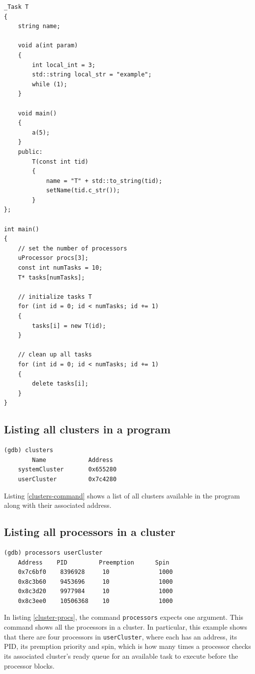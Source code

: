 \begin{lstlisting}[style=C++, caption={\uCPPS source code used for GDB commands},
label={uCPP-src-code}, basicstyle=\small]
_Task T
{
    string name;

    void a(int param)
    {
        int local_int = 3;
        std::string local_str = "example";
        while (1);
    }

    void main()
    {
        a(5);
    }
    public:
        T(const int tid)
        {
            name = "T" + std::to_string(tid);
            setName(tid.c_str());
        }
};

int main()
{
    // set the number of processors
    uProcessor procs[3];
    const int numTasks = 10;
    T* tasks[numTasks];

    // initialize tasks T
    for (int id = 0; id < numTasks; id += 1)
    {
        tasks[i] = new T(id);
    }

    // clean up all tasks
    for (int id = 0; id < numTasks; id += 1)
    {
        delete tasks[i];
    }
}
\end{lstlisting}

\subsection{Listing all clusters in a \uCPPS program}
\begin{lstlisting}[caption={clusters command}, label={clusters-command}]
(gdb) clusters
        Name            Address
    systemCluster       0x655280
    userCluster         0x7c4280
\end{lstlisting}
Listing \ref{clusters-command} shows a list of all clusters available in the
program
along with their associated address.

\subsection{Listing all processors in a cluster}
\begin{lstlisting}[caption={\text{cluster\_procs} command}, label={cluster-procs}]
(gdb) processors userCluster
    Address    PID         Preemption      Spin
    0x7c6bf0    8396928     10              1000
    0x8c3b60    9453696     10              1000
    0x8c3d20    9977984     10              1000
    0x8c3ee0    10506368    10              1000
\end{lstlisting}
In listing \ref{cluster-procs}, the command \verb|processors| expects one
argument. This command shows
all the processors in a cluster. In particular, this example shows that there
are four processors in \verb|userCluster|, where each has an address,
its PID, its premption priority and spin, which is how many times a processor
checks its associated cluster's ready queue for an available task to execute
before the processor blocks.

